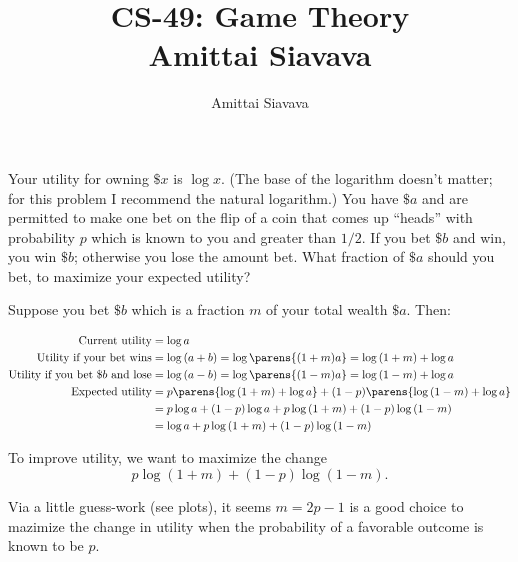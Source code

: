\documentclass[13pt, reqno]{amsart}
\begin{document}

\title{CS-49: Game Theory\\ Amittai Siavava \\ }
\author{Amittai Siavava}


\setlength{\headheight}{13.0pt}
\setlength{\footskip}{15.0pt}

\maketitle

\begin{problem}[3]
  Your utility for owning $\$x$ is $\log{x}$.
  (The base of the logarithm doesn't matter; for this problem I recommend the natural logarithm.)
  You have $\$a$ and are permitted to make one bet on the flip of a coin that comes up ``heads''
  with probability $p$ which is known to you and greater than $1/2$.
  If you bet $\$b$ and win, you win $\$b$; otherwise you lose the amount bet.
  What fraction of $\$a$ should you bet, to maximize your expected utility?

  Suppose you bet $\$b$ which is a fraction $m$ of your total wealth $\$a$.
  Then:
  
  \begin{align*}
    \text{Current utility} &= \log{a} \\
    \text{Utility if your bet wins} &= \log{(a + b)} = \log{\parens{(1 + m)a}} = \log{(1 + m)} + \log{a} \\
    \text{Utility if you bet $\$b$ and lose} &= \log{(a - b)} = \log{\parens{(1 - m)a}} = \log{(1 - m)} + \log{a} \\
    \text{Expected utility} &= p \parens{\log{(1 + m)} + \log{a}} + (1 - p)\parens{\log{(1 - m)} + \log{a}} \\
                            &= p \log{a} + (1 - p) \log{a} + p \log{(1 + m)} + (1 - p) \log{(1 - m)} \\
                            &= \log{a} + p \log{(1 + m)} + (1 - p) \log{(1 - m)} \\
  \end{align*}
  
  To improve utility, we want to maximize the change
  \[ p \log{(1 + m)} + (1 - p) \log{(1 - m)}. \]

  Via a little guess-work (see plots), it seems $m = 2p - 1$ is a good choice
  to mazimize the change in utility when the probability of a favorable outcome
  is known to be $p$.
  \begin{figure}[H]


\end{figure}
\end{problem}
\end{document}
